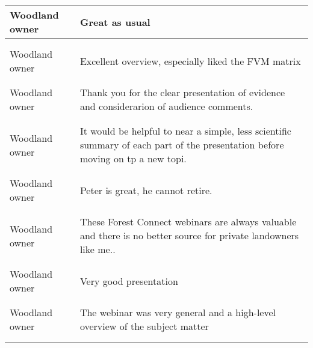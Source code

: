 \documentclass[
]{article}
\begin{document}
\begin{longtable}[t]{>{\raggedright\arraybackslash}p{5cm}>{\raggedright\arraybackslash}p{10cm}}
\midrule
Woodland owner & Great as usual\\
\midrule\\
\cellcolor{gray!10}{Woodland owner} & \cellcolor{gray!10}{Photos greatly help focus key ideas pointed out during illustration.  FVM Matrix was very helpful. Great Presentation!}\\
\midrule
Woodland owner & Excellent overview, especially liked the FVM matrix\\
\midrule\\
\cellcolor{gray!10}{Woodland owner} & \cellcolor{gray!10}{Thank you.}\\
\midrule
\addlinespace
Woodland owner & Thank you for the clear presentation of evidence and considerarion of audience comments.\\
\midrule\\
\cellcolor{gray!10}{Woodland owner} & \cellcolor{gray!10}{excellent knowledge of subject and practical solutions - and pitfalls.}\\
\midrule
Woodland owner & It would be helpful to near a simple, less scientific summary of each part of the presentation before moving on tp a new topi.\\
\midrule\\
\cellcolor{gray!10}{Woodland owner} & \cellcolor{gray!10}{Very good reinforcement of good practices}\\
\midrule
Woodland owner & Peter is great, he cannot retire.\\
\midrule\\
\addlinespace
\cellcolor{gray!10}{Woodland owner} & \cellcolor{gray!10}{He gives  all sides of solutions.}\\
\midrule
Woodland owner & These Forest Connect webinars are always valuable and there is no better source for private landowners like me..\\
\midrule\\
\cellcolor{gray!10}{Woodland owner} & \cellcolor{gray!10}{Very well done presentation.}\\
\midrule
Woodland owner & Very good presentation\\
\midrule\\
\cellcolor{gray!10}{Woodland owner} & \cellcolor{gray!10}{Great presentation}\\
\midrule
\addlinespace
Woodland owner & The webinar was very general and a high-level overview of the subject matter\\
\midrule\\
\cellcolor{gray!10}{Woodland owner} & \cellcolor{gray!10}{Excellent; will rewatch the recording}\\

\end{longtable}
\end{document}
